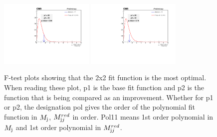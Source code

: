 \begin{figure}[!htb]
	\includegraphics[width=0.4\textwidth]{Figures/ftest_vs_FTESTBNEWpol22_pol23_notoys.pdf}
	\includegraphics[width=0.4\textwidth]{Figures/ftest_vs_FTESTBNEWpol22_pol32_notoys.pdf}
	\caption{F-test plots showing that the 2x2 fit function is the most optimal. When reading these plot, p1 is the base fit function and p2 is the function that is being compared as an improvement. Whether for p1 or p2, the designation pol gives the 
	order of the polynomial fit function in $M_{\textrm j}$, $M_{\textrm jj}^{red}$ in order. Pol11 means 1st order polynomial in $M_{\textrm j}$ and 1st order polynomial in $M_{\textrm jj}^{red}$.}
	\label{fig:ftest_plots}
\end{figure} 
\clearpage
